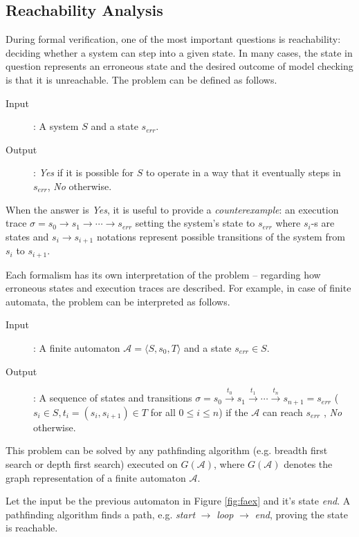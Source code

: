 \subsection{Reachability Analysis}
During formal verification, one of the most important questions is reachability: deciding whether a system can step into a given state. In many cases, the state in question represents an erroneous state and the desired outcome of model checking is that it is unreachable. The problem can be defined as follows.
\begin{description}
	\item[Input]: A system $S$ and a state $s_{err}$.
	\item[Output]: \emph{Yes} if it is possible for $S$ to operate in a way that it eventually steps in $s_{err}$, \emph{No} otherwise.
\end{description}

When the answer is \emph{Yes}, it is useful to provide a \emph{counterexample}: an execution trace $\sigma = s_0 \to s_1 \to \cdots \to s_{err}$ setting the system's state to $s_{err}$ where $s_i$-s are states  and $s_i \to s_{i+1}$ notations represent possible transitions of the system from $s_i$ to $s_{i+1}$.

Each formalism has its own interpretation of the problem -- regarding how erroneous states and execution traces are described. For example, in case of finite automata, the problem can be interpreted as follows. 

\begin{description}
	\item[Input]: A finite automaton $\mathcal{A}=\langle S,s_0,T\rangle$ and a state $s_{err} \in S$.
	\item[Output]: A sequence of states and transitions $\sigma = s_0 \xrightarrow{t_0} s_1 \xrightarrow{t_1} \cdots \xrightarrow{t_n} s_{n+1}=s_{err}$ ($s_i \in S, t_i=(s_i,s_{i+1}) \in T$ for all $0 \leq i \leq n$) if the $\mathcal{A}$ can reach $s_{err}$ , \emph{No} otherwise.
\end{description}

This problem can be solved by any pathfinding algorithm (e.g. breadth first search or depth first search) executed on $G(\mathcal{A})$, where $G(\mathcal{A})$ denotes the graph representation of a finite automaton $\mathcal{A}$.

\begin{example}
	Let the input be the previous automaton in Figure \ref{fig:faex} and it's state \emph{end}. A pathfinding algorithm finds a path, e.g. \emph{start} $\to$ \emph{loop} $\to$ \emph{end}, proving the state is reachable. 
\end{example}

